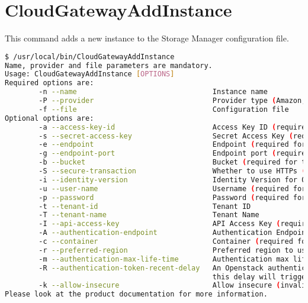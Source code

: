 \documentclass[11pt,fleqn,openany]{book} %
\begin{document}
\clearpage

\section*{CloudGatewayAddInstance}
\label{sec:cloudgatewayaddinstance}

This command adds a new instance to the Storage Manager configuration file.

\begin{lstlisting}[language=bash]
$ /usr/local/bin/CloudGatewayAddInstance
Name, provider and file parameters are mandatory.
Usage: CloudGatewayAddInstance [OPTIONS]
Required options are:
        -n --name                                Instance name
        -P --provider                            Provider type (Amazon, Openstack)
        -f --file                                Configuration file
Optional options are:
        -a --access-key-id                       Access Key ID (required for type Amazon)
        -s --secret-access-key                   Secret Access Key (required for type Amazon)
        -e --endpoint                            Endpoint (required for type Amazon)
        -g --endpoint-port                       Endpoint port (required for type Amazon)
        -b --bucket                              Bucket (required for type Amazon)
        -S --secure-transaction                  Whether to use HTTPs (required for Amazon)
        -i --identity-version                    Identity Version for Openstack (required for Openstack)
        -u --user-name                           Username (required for Openstack)
        -p --password                            Password (required for Openstack v2)
        -t --tenant-id                           Tenant ID
        -T --tenant-name                         Tenant Name
        -I --api-access-key                      API Access Key (required for Openstack v1)
        -A --authentication-endpoint             Authentication Endpoint (required for Openstack)
        -c --container                           Container (required for Openstack)
        -r --preferred-region                    Preferred region to use with Openstack, if any
        -m --authentication-max-life-time        Authentication max lifetime for an Openstack token
        -R --authentication-token-recent-delay   An Openstack authentication error with a token older than
                                                 this delay will trigger a re-authentication
        -k --allow-insecure                      Allow insecure (invalid certificate) communication
Please look at the product documentation for more information.
\end{lstlisting}
\end{document}
